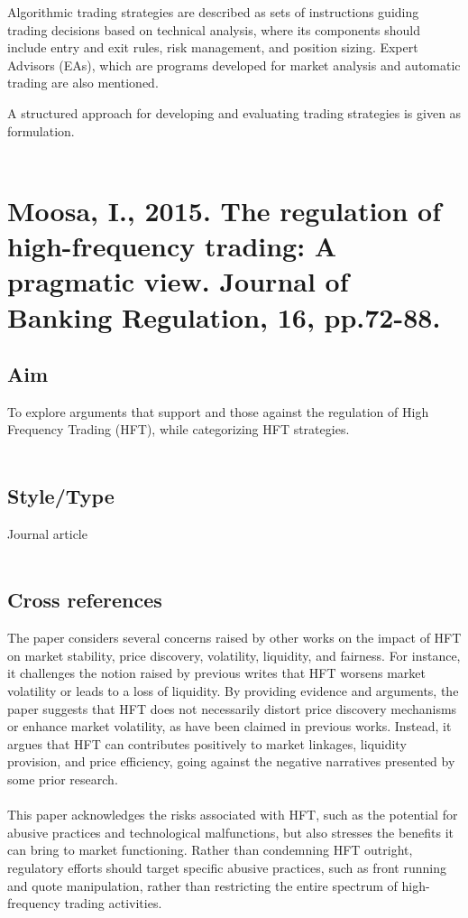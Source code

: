\documentclass{article}
\begin{document}
    Algorithmic trading strategies are described as sets of instructions guiding trading decisions based on technical analysis, where its components should include entry and exit rules, risk management, and position sizing. Expert Advisors (EAs), which are programs developed for market analysis and automatic trading are also mentioned.
    
    A structured approach for developing and evaluating trading strategies is given as formulation.\\\\
        
\section{Moosa, I., 2015. The regulation of high-frequency trading: A pragmatic view. Journal of Banking Regulation, 16, pp.72-88.}
    \justify
    \setlength{\parindent}{1em} %
    \subsection*{Aim}
    To explore arguments that support and those against the regulation of High Frequency Trading (HFT), while categorizing HFT strategies.\\\\
    
    \subsection*{Style/Type}
    Journal article\\\\
    
    \subsection*{Cross references}
    The paper considers several concerns raised by other works on the impact of HFT on market stability, price discovery, volatility, liquidity, and fairness. For instance, it challenges the notion raised by previous writes that HFT worsens market volatility or leads to a loss of liquidity. By providing evidence and arguments, the paper suggests that HFT does not necessarily distort price discovery mechanisms or enhance market volatility, as have been claimed in previous works. Instead, it argues that HFT can contributes positively to market linkages, liquidity provision, and price efficiency, going against the negative narratives presented by some prior research.\\\\
    This paper acknowledges the risks associated with HFT, such as the potential for abusive practices and technological malfunctions, but also stresses the benefits it can bring to market functioning. Rather than condemning HFT outright, regulatory efforts should target specific abusive practices, such as front running and quote manipulation, rather than restricting the entire spectrum of high-frequency trading activities.
    
\end{document}
